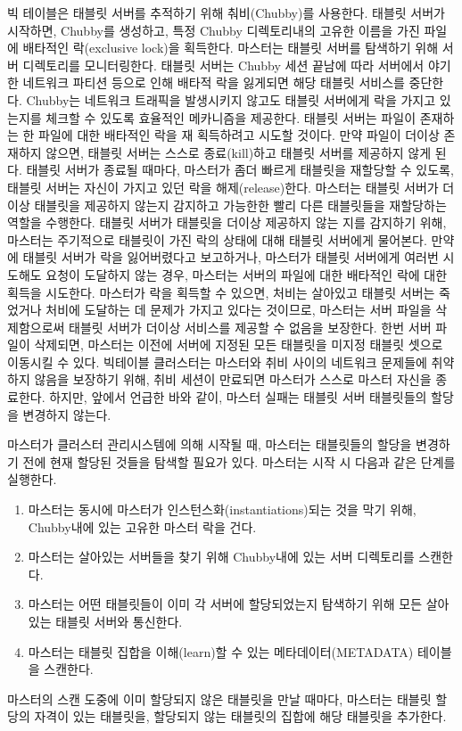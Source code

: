 \documentclass[twocolumn]{article}
\newcommand{\be}{\begin{enumerate}}
\newcommand{\ee}{\end{enumerate}}
\newcommand{\ii}{\item}
\begin{document}
빅 테이블은 태블릿 서버를 추적하기 위해 춰비(Chubby)를 사용한다. 태블릿 서버가 시작하면, Chubby를 생성하고, 특정 Chubby 디렉토리내의 고유한 이름을 가진 파일에 배타적인 락(exclusive lock)을 획득한다. 마스터는 태블릿 서버를 탐색하기 위해 서버 디렉토리를 모니터링한다.
태블릿 서버는 Chubby 세션 끝남에 따라 서버에서 야기한 네트워크 파티션 등으로 인해 배타적 락을 잃게되면 해당 태블릿 서비스를 중단한다.
Chubby는 네트워크 트래픽을 발생시키지 않고도 태블릿 서버에게 락을 가지고 있는지를 체크할 수 있도록 효율적인 메카니즘을 제공한다.
태블릿 서버는 파일이 존재하는 한 파일에 대한 배타적인 락을 재 획득하려고 시도할 것이다. 만약 파일이 더이상 존재하지 않으면,  태블릿 서버는 스스로 종료(kill)하고 태블릿 서버를 제공하지 않게 된다.
태블릿 서버가 종료될 때마다, 마스터가 좀더 빠르게 태블릿을 재할당할 수 있도록, 태블릿 서버는 자신이 가지고 있던 락을 해제(release)한다.
마스터는 태블릿 서버가 더이상 태블릿을 제공하지 않는지 감지하고 가능한한 빨리 다른 태블릿들을 재할당하는 역할을 수행한다.
태블릿 서버가 태블릿을 더이상 제공하지 않는 지를 감지하기 위해, 마스터는 주기적으로 태블릿이 가진 락의 상태에 대해 태블릿 서버에게 물어본다.
만약에 태블릿 서버가 락을 잃어버렸다고 보고하거나, 마스터가 태블릿 서버에게 여러번 시도해도 요청이 도달하지 않는 경우,
마스터는 서버의 파일에 대한 배타적인 락에 대한 획득을 시도한다.
마스터가 락을 획득할 수 있으면, 처비는 살아있고 태블릿 서버는 죽었거나 처비에 도달하는 데 문제가 가지고 있다는 것이므로,
마스터는 서버 파일을 삭제함으로써 태블릿 서버가 더이상 서비스를 제공할 수 없음을 보장한다.
한번 서버 파일이 삭제되면, 마스터는 이전에 서버에 지정된 모든 태블릿을 미지정 태블릿 셋으로 이동시킬 수 있다.
빅테이블 클러스터는 마스터와 취비 사이의 네트워크 문제들에 취약하지 않음을 보장하기 위해, 취비 세션이 만료되면 마스터가 스스로 마스터 자신을 종료한다.
하지만, 앞에서 언급한 바와 같이, 마스터 실패는 태블릿 서버 태블릿들의 할당을 변경하지 않는다.

마스터가 클러스터 관리시스템에 의해 시작될 때, 마스터는 태블릿들의 할당을 변경하기 전에 현재 할당된 것들을 탐색할 필요가 있다.
마스터는 시작 시 다음과 같은 단계를 실행한다.
\be
\ii 마스터는 동시에 마스터가 인스턴스화(instantiations)되는 것을 막기 위해, Chubby내에 있는 고유한 마스터 락을 건다.
\ii 마스터는 살아있는 서버들을 찾기 위해 Chubby내에 있는 서버 디렉토리를 스캔한다.
\ii 마스터는 어떤 태블릿들이 이미 각 서버에 할당되었는지 탐색하기 위해 모든 살아있는 태블릿 서버와 통신한다.
\ii 마스터는 태블릿 집합을 이해(learn)할 수 있는 메타데이터(METADATA) 테이블을 스캔한다.
\ee
마스터의 스캔 도중에 이미 할당되지 않은 태블릿을 만날 때마다,
마스터는 태블릿 할당의 자격이 있는 태블릿을, 할당되지 않는 태블릿의 집합에 해당 태블릿을 추가한다.
\end{document}
